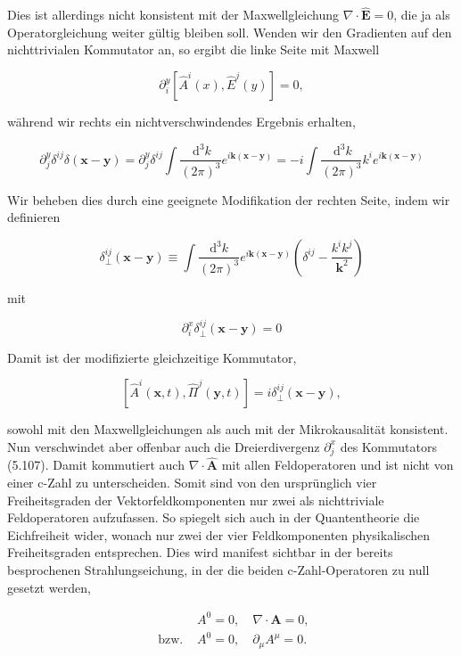 \documentclass[10pt, letterpaper]{article}
\begin{document}
Dies ist allerdings nicht konsistent mit der Maxwellgleichung $\nabla \cdot \hat{\mathbf{E}}=0$, die ja als Operatorgleichung weiter gültig bleiben soll. Wenden wir den Gradienten auf den nichttrivialen Kommutator an, so ergibt die linke Seite mit Maxwell

$$
\partial_{i}^{y}\left[\hat{A}^{i}(x), \hat{E}^{j}(y)\right]=0,
$$

während wir rechts ein nichtverschwindendes Ergebnis erhalten,

$$
\partial_{j}^{y} \delta^{i j} \delta(\mathbf{x}-\mathbf{y})=\partial_{j}^{y} \delta^{i j} \int \frac{\mathrm{~d}^{3} k}{(2 \pi)^{3}} e^{i \mathbf{k}(\mathbf{x}-\mathbf{y})}=-i \int \frac{\mathrm{~d}^{3} k}{(2 \pi)^{3}} k^{i} e^{i \mathbf{k}(\mathbf{x}-\mathbf{y})}
$$

Wir beheben dies durch eine geeignete Modifikation der rechten Seite, indem wir definieren

$$
\delta_{\perp}^{i j}(\mathbf{x}-\mathbf{y}) \equiv \int \frac{\mathrm{d}^{3} k}{(2 \pi)^{3}} e^{i \mathbf{k}(\mathbf{x}-\mathbf{y})}\left(\delta^{i j}-\frac{k^{i} k^{j}}{\mathbf{k}^{2}}\right)
$$

mit

$$
\partial_{i}^{x} \delta_{\perp}^{i j}(\mathbf{x}-\mathbf{y})=0
$$

Damit ist der modifizierte gleichzeitige Kommutator,

$$
\left[\hat{A}^{i}(\mathbf{x}, t), \hat{\Pi}^{j}(\mathbf{y}, t)\right]=i \delta_{\perp}^{i j}(\mathbf{x}-\mathbf{y}),
$$

sowohl mit den Maxwellgleichungen als auch mit der Mikrokausalität konsistent.\\
Nun verschwindet aber offenbar auch die Dreierdivergenz $\partial_{j}^{x}$ des Kommutators (5.107). Damit kommutiert auch $\nabla \cdot \hat{\mathbf{A}}$ mit allen Feldoperatoren und ist nicht von einer c-Zahl zu unterscheiden. Somit sind von den ursprünglich vier Freiheitsgraden der Vektorfeldkomponenten nur zwei als nichttriviale Feldoperatoren aufzufassen. So spiegelt sich auch in der Quantentheorie die Eichfreiheit wider, wonach nur zwei der vier Feldkomponenten physikalischen Freiheitsgraden entsprechen. Dies wird manifest sichtbar in der bereits besprochenen Strahlungseichung, in der die beiden c-Zahl-Operatoren zu null gesetzt werden,

$$
\begin{array}{ll} 
& A^{0}=0, \quad \nabla \cdot \mathbf{A}=0, \\
\text { bzw. } & A^{0}=0, \quad \partial_{\mu} A^{\mu}=0 .
\end{array}
$$
\end{document}
